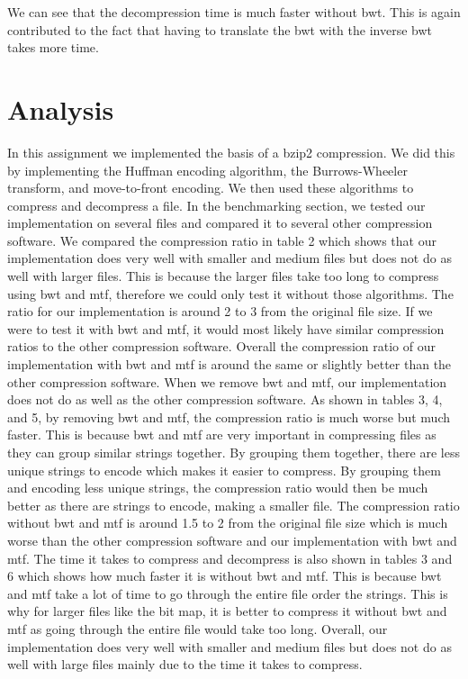 \documentclass[12pt,letterpaper]{article}
\begin{document}
We can see that the decompression time is much faster without bwt.
This is again contributed to the fact that having to translate the bwt with the inverse bwt takes more time.

\section*{Analysis}

In this assignment we implemented the basis of a bzip2 compression.
We did this by implementing the Huffman encoding algorithm, the Burrows-Wheeler transform, and move-to-front encoding.
We then used these algorithms to compress and decompress a file.
In the benchmarking section, we tested our implementation on several files and compared it to several other compression software.
We compared the compression ratio in table 2 which shows that our implementation 
does very well with smaller and medium files but does not do as well with larger files.
This is because the larger files take too long to compress using bwt and mtf, therefore we 
could only test it without those algorithms. 
The ratio for our implementation is around 2 to 3 from the original file size.
If we were to test it with bwt and mtf, it would
most likely have similar compression ratios to the other compression software.
Overall the compression ratio of our implementation with bwt and mtf is around the same or slightly better than the other compression software.
When we remove bwt and mtf, our implementation does not do as well as the other compression software.
As shown in tables 3, 4, and 5, by removing bwt and mtf, the compression ratio is much worse but much faster.
This is because bwt and mtf are very important in compressing files as they can group similar strings together.
By grouping them together, there are less unique strings to encode which makes it easier to compress.
By grouping them and encoding less unique strings, the compression ratio would then be much better as there are strings to encode, making a smaller file.
The compression ratio without bwt and mtf is around 1.5 to 2 from the original file size which is much worse than the other compression software and our implementation with bwt and mtf.
The time it takes to compress and decompress is also shown in tables 3 and 6 which shows how much faster it is without bwt and mtf.
This is because bwt and mtf take a lot of time to go through the entire file order the strings.
This is why for larger files like the bit map, it is better to compress it without bwt and mtf as going through the entire file would take too long.
Overall, our implementation does very well with smaller and medium files but does not do as well with large files mainly due to the time it takes to compress.
\end{document}
